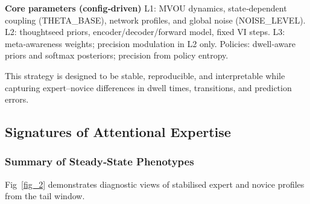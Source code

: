 \documentclass[openacc]{rsproca_new}%
\begin{document}
\textbf{Core parameters (config‑driven)}  
L1: MVOU dynamics, state‑dependent coupling (THETA\_BASE), network profiles, and global noise (NOISE\_LEVEL).  
L2: thoughtseed priors, encoder/decoder/forward model, fixed VI steps.  
L3: meta‑awareness weights; precision modulation in L2 only.  
Policies: dwell‑aware priors and softmax posteriors; precision from policy entropy.

This strategy is designed to be stable, reproducible, and interpretable while capturing expert–novice differences in dwell times, transitions, and prediction errors.

\subsection{Signatures of Attentional Expertise}

\subsubsection{Summary of Steady‑State Phenotypes}
Fig~\ref{fig_2} demonstrates diagnostic views of stabilised expert and novice profiles from the tail window.
\end{document}

